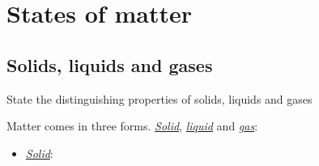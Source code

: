 \section{States of matter}
\subsection{Solids, liquids and gases}

\begin{point}
State the distinguishing properties of solids, liquids and gases
\end{point}

Matter comes in three forms. \ul{\emph{Solid}}, 
\ul{\emph{liquid}} and \ul{\emph{gas}}: 

\begin{itemize}
	\setlength\itemsep{0em}
	\item \ul{\emph{Solid}}:
\end{itemize}
